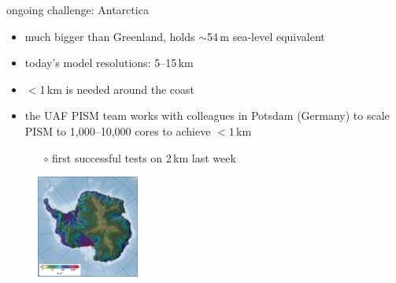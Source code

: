 \documentclass[hide notes,intlimits]{beamer}
\begin{document}
\begin{frame}{ongoing challenge: Antarctica}

    \begin{itemize}
    \item much bigger than Greenland, holds $\sim$54\,m sea-level equivalent
    \item today's model resolutions: 5--15\,km
    \item $<$1\,km is needed around the coast
    \item the UAF PISM team works with colleagues in Potsdam (Germany) to scale PISM to 1,000--10,000 cores to achieve $<1\,$km
      \begin{itemize}
      \item[$\circ$] first successful tests on 2\,km last week
      \end{itemize}
    \end{itemize}

\begin{figure}
    \includegraphics[width=0.3\textwidth]{antartica-speed-exp-5km}
\end{figure}
\end{frame}
\end{document}
